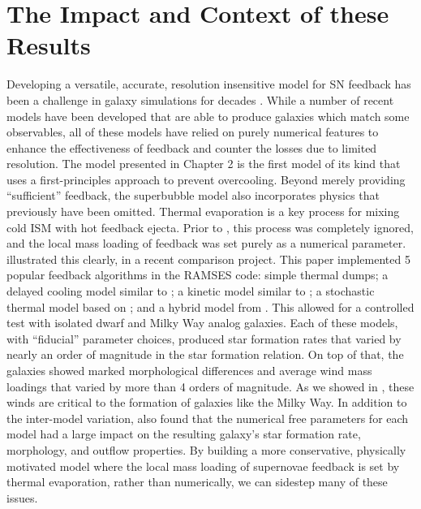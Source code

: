 \section{The Impact and Context of these Results}
Developing a versatile, accurate, resolution insensitive model for SN feedback
has been a challenge in galaxy simulations for decades \citep{Katz1992}.  While
a number of recent models have been developed that are able to produce galaxies
which match some observables, all of these models have relied on purely
numerical features to enhance the effectiveness of feedback and counter the
losses due to limited resolution.  The \citet{Keller2014} model presented in
Chapter 2 is the first model of its kind that uses a first-principles approach
to prevent overcooling.  Beyond merely providing ``sufficient'' feedback, the
superbubble model also incorporates physics that previously have been omitted.
Thermal evaporation is a key process for mixing cold ISM with hot feedback
ejecta.  Prior to \citet{Keller2014}, this process was completely ignored, and
the local mass loading of feedback was set purely as a numerical parameter.
\citet{Rosdahl2016} illustrated this clearly, in a recent comparison project.
This paper implemented 5 popular feedback algorithms in the {\sc RAMSES} code:
simple thermal dumps; a delayed cooling model similar to \citet{Agertz2013}; a
kinetic model similar to \citet{DallaVecchia2008}; a stochastic thermal model
based on \citet{DallaVecchia2012}; and a hybrid model from \citet{Kimm2015}.
This allowed for a controlled test with isolated dwarf and Milky Way analog
galaxies. Each of these models, with ``fiducial'' parameter choices, produced
star formation rates that varied by nearly an order of magnitude in the
\citet{Kennicutt1998} star formation relation.  On top of that, the galaxies
showed marked morphological differences and average wind mass loadings that
varied by more than 4 orders of magnitude.  As we showed in \citet{Keller2015},
these winds are critical to the formation of galaxies like the Milky Way.  In
addition to the inter-model variation, \citet{Rosdahl2016} also found that the
numerical free parameters for each model had a large impact on the resulting
galaxy's star formation rate, morphology, and outflow properties.  By building a
more conservative, physically motivated model where the local mass loading of
supernovae feedback is set by thermal evaporation, rather than numerically, we
can sidestep many of these issues.

